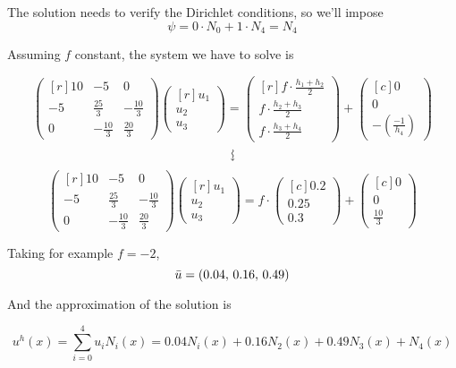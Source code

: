 \begin{example}
The solution needs to verify the Dirichlet conditions, so we'll impose $$\psi = 0\cdot N_0 + 1\cdot N_4 = N_4$$

Assuming $f$ constant, the system we have to solve is

\[
  \begin{pmatrix*}[r]
    10 & -5            & 0\\
    -5 & \frac{25}{3}  & -\frac{10}{3}\\
    0  & -\frac{10}{3} & \frac{20}{3}
  \end{pmatrix*}
  \begin{pmatrix*}[r]
    u_1\\ u_2 \\ u_3
  \end{pmatrix*} =
  \begin{pmatrix*}[r]
    f\cdot \frac{h_1 + h_2}{2}\\f\cdot \frac{h_2 + h_3}{2}\\f\cdot \frac{h_3 + h_4}{2}
  \end{pmatrix*} + 
  \begin{pmatrix*}[c]
    0\\0\\ -\left(\frac{-1}{h_4}\right)
  \end{pmatrix*}
\]
$$\text{\rotatebox{270}{$\leadsto$}}$$
\[
  \begin{pmatrix*}[r]
    10 & -5            & 0\\
    -5 & \frac{25}{3}  & -\frac{10}{3}\\
    0  & -\frac{10}{3} & \frac{20}{3}
  \end{pmatrix*}
  \begin{pmatrix*}[r]
    u_1\\ u_2 \\ u_3
  \end{pmatrix*} =
  f\cdot\begin{pmatrix*}[c]
    0.2\\0.25\\0.3
  \end{pmatrix*} + 
  \begin{pmatrix*}[c]
    0\\0\\ \frac{10}{3}
  \end{pmatrix*}
\]

Taking for example $f=-2$, $$\Bar{u} = (0.04,\, 0.16,\,0.49)$$

And the approximation of the solution is

\[
  u^h(x) = \sum_{i=0}^4u_iN_i(x) = 0.04N_i(x) + 0.16N_2(x) + 0.49N_3(x) + N_4(x)
\]

\end{example}